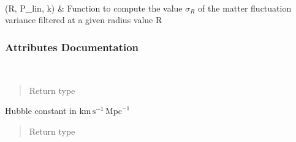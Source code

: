 \documentclass[letterpaper,10pt,english]{sphinxmanual}
\begin{document}
\begin{fulllineitems}
\begin{savenotes}
\begin{longtable}[c]{}
\begin{quote}
\begin{description}
\end{description}\end{quote}

\\
\hline
\sphinxAtStartPar
{\hyperref[\detokenize{api/seyfert.cosmology.cosmology.Cosmology:seyfert.cosmology.cosmology.Cosmology.sigmaR}]{}}(R, P\_lin, k)
&
\sphinxAtStartPar
Function to compute the value \(\sigma_R\) of the matter fluctuation variance filtered at a given radius value R
\\
\hline
\end{longtable}\sphinxatlongtableend\end{savenotes}
\subsubsection*{Attributes Documentation}

\begin{fulllineitems}
\label{\detokenize{api/seyfert.cosmology.cosmology.Cosmology:seyfert.cosmology.cosmology.Cosmology.E_z}}~\begin{quote}\begin{description}
\item[{Return type}] \leavevmode
\sphinxAtStartPar
{}

\end{description}\end{quote}

\end{fulllineitems}


\begin{fulllineitems}
\label{\detokenize{api/seyfert.cosmology.cosmology.Cosmology:seyfert.cosmology.cosmology.Cosmology.H0}}
\sphinxAtStartPar
Hubble constant in \(\mathrm{km \, s^{-1}\, {Mpc}^{-1}}\)
\begin{quote}\begin{description}
\item[{Return type}] \leavevmode
\sphinxAtStartPar
{}


\end{description}
\end{quote}
\end{fulllineitems}
\end{fulllineitems}
\end{document}
